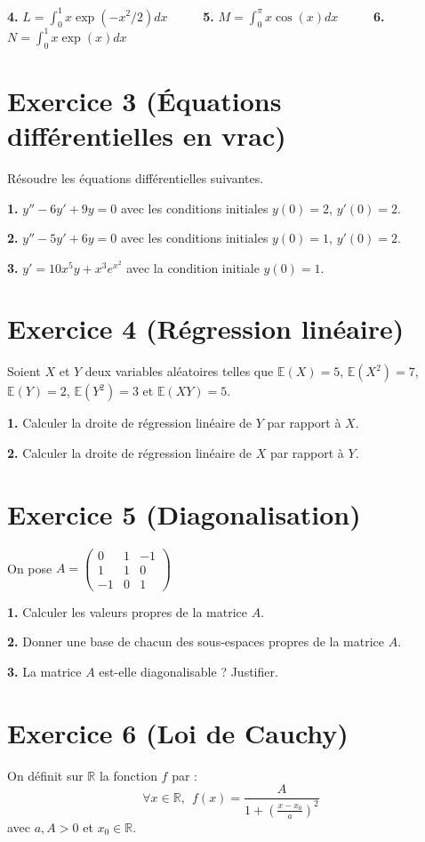 \documentclass[5pt]{article}
\newcommand{\E}{\mathbb{E}}
\begin{document}
\textbf{4.} $L=\int_0^1 x \exp{(-x^2/2)} dx$ \ \ \ \ \ \textbf{5.} $M=\int_0^{\pi} x \cos(x) dx$ \ \ \ \ \ \textbf{6.} $N = \int_0^1 x \exp{(x)} dx$

\section*{Exercice 3 (Équations différentielles en vrac)}

Résoudre les équations différentielles suivantes.

\textbf{1.} $y'' -6y' +9y = 0$ avec les conditions initiales $y(0)=2$, $y'(0)=2$.

\textbf{2.} $y'' -5y' +6y = 0$ avec les conditions initiales $y(0)=1$, $y'(0)=2$.

\textbf{3.} $y' = 10x^5 y + x^3 e^{x^2}$ avec la condition initiale $y(0)=1$.

\section*{Exercice 4 (Régression linéaire)}

Soient $X$ et $Y$ deux variables aléatoires telles que $\E (X)=5$, $\E(X^2) = 7$, $\E (Y)=2$, $\E(Y^2) = 3$ et $\E (XY) =5$. 

\textbf{1.} Calculer la droite de régression linéaire de $Y$ par rapport à $X$.

\textbf{2.} Calculer la droite de régression linéaire de $X$ par rapport à $Y$.

\section*{Exercice 5 (Diagonalisation)}

On pose $A = \begin{pmatrix}
0 & 1 & -1 \\
1 & 1 & 0 \\
-1 & 0 & 1
\end{pmatrix}$

\textbf{1.} Calculer les valeurs propres de la matrice $A$.

\textbf{2.} Donner une base de chacun des sous-espaces propres de la matrice $A$.

\textbf{3.} La matrice $A$ est-elle diagonalisable ? Justifier.

\section*{Exercice 6 (Loi de Cauchy)}
On définit sur $\mathbb{R}$ la fonction $f$ par : 
$$\forall x \in \mathbb{R}, \ \ f(x)=\frac{A}{1+\left( \frac{x-x_0}{a}  \right)^2}$$ 
avec $a, A >0$ et $x_0 \in \mathbb{R}$.\\
\end{document}
